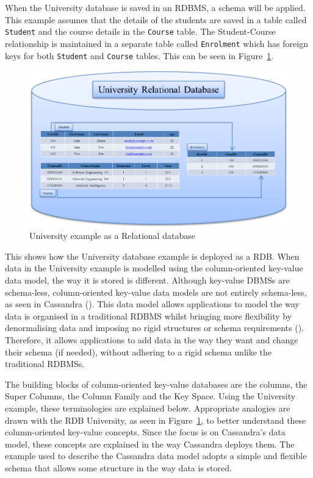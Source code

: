 When the University database is saved in an \ac{RDBMS},   a schema will be
applied. This example assumes that the details of the students are saved in a
table called \texttt{Student} and the course details in the \texttt{Course}
table. The Student-Course relationship is maintained in a separate table called
\texttt{Enrolment} which has foreign keys for both \texttt{Student} and
\texttt{Course} tables.  This can be seen in Figure~\ref{f:RDB}. 


\begin{figure}[h]
	\centering
	\includegraphics[width=.8\textwidth]{./figure/Example/Relational-DB.png}
	\caption{University example as a Relational database}\label{f:RDB}
\end{figure}

This shows how the University database example is deployed as a
\ac{RDB}.  When data in the University example is modelled using the
column-oriented key-value data model,   the way it is stored is different. 
Although key-value \acp{DBMS} are schema-less,   column-oriented key-value data
models are not entirely schema-less,   as seen in Cassandra ().  This data model allows applications to model the way data is
organised in a traditional RDBMS whilst bringing more flexibility by
denormalising data and imposing no rigid structures or schema requirements
().  Therefore,   it allows applications to add data in the
way they want and change their schema (if needed),   without adhering to a
rigid schema unlike the traditional \acp{RDBMS}. 

The building blocks of column-oriented key-value databases are the columns,  
the Super Columns,   the Column Family and the Key Space.  Using the
University example,   these terminologies are explained below. 
Appropriate analogies are drawn with the \ac{RDB} University,   as
seen in Figure~\ref{f:RDB},   to better understand these column-oriented key-value
concepts.  Since the focus is on Cassandra's data model,   these concepts
are explained in the way Cassandra deploys them.  The example used
to describe the Cassandra data model adopts a simple and flexible schema that
allows some structure in the way data is stored. 

